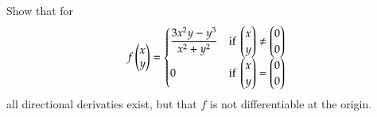                                                                                                                                                                                                                                                                                                                                                                                                                                                                                                                                                                                                                                                                                                                                                                                                                                                                                                                                                                                                                                                                                                                                                                                                                                                                                                                                                                                                                                                                                                                                                                                                                                                                                                                                                                                                                                                                                                                                                                                                                                                                                                                                                                                                                                                                                                                                                                                                                                                                                                                                                                                                                                                                                                                      


  Show that for
  \[f\begin{pmatrix} x \\ y \end{pmatrix} = \begin{cases}
  \displaystyle \frac{3x^2y - y^3}{x^2+y^2} & \text{if } \begin{pmatrix} x \\ y \end{pmatrix} \neq \begin{pmatrix} 0 \\ 0 \end{pmatrix} \\
  0 & \text{if } \begin{pmatrix} x \\ y \end{pmatrix} = \begin{pmatrix} 0 \\ 0 \end{pmatrix}
  \end{cases}\]
  all directional derivaties exist, but that $f$ is not differentiable at the origin.

